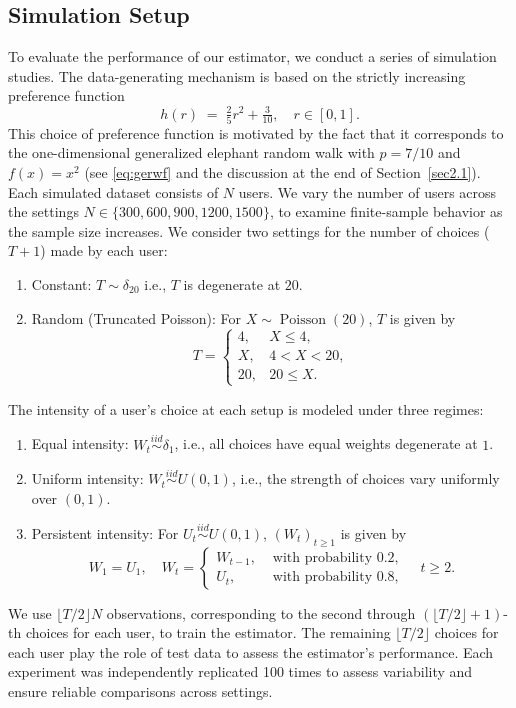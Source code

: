 \documentclass[12pt]{amsart}
\theoremstyle{plain}
\theoremstyle{remark}
\numberwithin{equation}{section}
\begin{document}
\subsection{Simulation Setup}\label{sec:ss}

To evaluate the performance of our estimator, we conduct a series of simulation studies. The data-generating mechanism is based on the strictly increasing preference function
\[
h(r) \;=\; \tfrac{2}{5} r^{2} + \tfrac{3}{10}, \quad r \in [0,1].
\]
This choice of preference function is motivated by the fact that it corresponds to the one-dimensional generalized elephant random walk with $p = 7/10$ and $f(x) = x^2$ (see \eqref{eq:gerwf} and the discussion at the end of Section~\ref{sec2.1}).
Each simulated dataset consists of  
$N$ users. 
We vary the number of 
users across the settings
$N \in \{300, 600, 900, 1200, 1500\}$,
to examine finite-sample behavior as the sample size increases. We consider two settings for the number of choices ($T+1$) made by each user: 

\begin{enumerate}[nosep]
    \item {Constant:} \(T \sim \delta_{20}\) i.e., $T$ is degenerate at $20$. 
    \item {Random (Truncated Poisson):} 
    For $X \sim \operatorname{Poisson} (20)$, $T$ is given by
    \[
       T = \begin{cases}4, &X \leq 4, \\[-.4cm] X, &4 < X < 20,  \\[-.4cm] 20, &20 \leq X.\end{cases}
    \]
\end{enumerate}
The intensity of a user’s choice at each setup is modeled under three regimes:
\begin{enumerate}[nosep]
    \item {Equal intensity:} 
    \(W_{t} \overset{iid}{\sim} \delta_1\), i.e., all choices have equal weights degenerate at $1$.
    \item {Uniform intensity:} 
    \(W_{t} \overset{iid}{\sim} U(0,1)\), i.e., the strength of choices vary 
    uniformly over $(0,1)$. 
    \item Persistent intensity:
For \(U_{t} \overset{iid}{\sim} U(0,1)\), $(W_t)_{t \geq 1}$ is given by 
    \[
        W_1 = U_1, \quad W_t = \begin{cases} W_{t-1}, &\text{ with probability } 0.2,\\[-.4cm] U_t, &\text{ with probability } 0.8,\end{cases} \quad t \geq 2.
    \]
\end{enumerate}
We use \(\lfloor T/2 \rfloor N\) observations, corresponding to the second through $(\lfloor T/2 \rfloor + 1)$-th choices for each user, to train the estimator. The remaining \(\lfloor T/2 \rfloor\) 
choices for each user play the role of test data to assess the estimator's performance. Each experiment was independently replicated {100 times} to assess variability and 
ensure reliable comparisons across settings.
\end{document}
